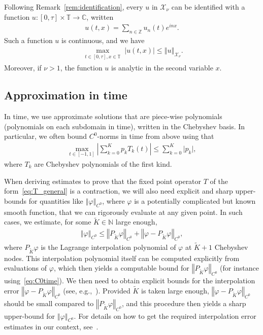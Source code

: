 \documentclass[10pt,a4paper]{article}
\theoremstyle{plain}
\newcommand{\ZZ}{\mathbb Z}
\newcommand{\TT}{\mathbb T}
\newcommand{\CC}{\mathbb C}
\newcommand{\NN}{\mathbb N}
\newcommand{\X}{\mathcal{X}}
\newcommand{\1}{\mathbf{1}}
\begin{document}
Following Remark~\ref{rem:identification}, every $u$ in $\X_\nu$ can be identified with a function $u:[0,\tau]\times\TT\to \CC$, written
\begin{align*}
u(t,x) = \sum_{n\in\ZZ} u_n(t) e^{inx}.
\end{align*}
Such a function $u$ is continuous, and we have
\begin{align*}
\max_{\substack{ t\in[0,\tau] , x \in \TT }} \left\vert u(t,x)\right\vert	\leq \left\Vert u\right\Vert_{\X_\nu}.
\end{align*}
Moreover, if $\nu>1$, the function $u$ is analytic in the second variable $x$.

\subsection{Approximation in time}
\label{sec:interp}

In time, we use approximate solutions that are piece-wise polynomials (polynomials on each subdomain in time), written in the Chebyshev basis. In particular, we often bound $C^0$-norms in time from above using that 
\begin{align}
\label{eq:C0time}
\max_{t\in[-1,1]} \left\vert \sum_{k=0}^K p_k T_k(t) \right\vert \leq \sum_{k=0}^K \vert p_k\vert,
\end{align}
where $T_k$ are Chebyshev polynomials of the first kind.


When deriving estimates to prove that the fixed point operator $T$ of the form~\eqref{eq:T_general} is a contraction, we will also need explicit and sharp upper-bounds for quantities like 
$\left\Vert \varphi \right\Vert_{C^0}$, where $\varphi$ is a potentially complicated but known smooth function, that we can rigorously evaluate at any given point. In such cases, we estimate, for some $\tilde{K}\in\NN$ large enough,
\begin{align}
\label{eq:C0interp}
\left\Vert \varphi \right\Vert_{C^0} \leq  \left\Vert P_{\tilde{K}}\varphi \right\Vert_{C^0} + \left\Vert \varphi - P_{\tilde{K}}\varphi \right\Vert_{C^0},
\end{align}
where $P_{\tilde{K}}\varphi$ is the Lagrange interpolation polynomial of $\varphi$ at $\tilde{K}+1$ Chebyshev nodes. This interpolation polynomial itself can be computed explicitly from evaluations of $\varphi$, which then yields a computable bound for $\left\Vert P_{\tilde{K}}\varphi \right\Vert_{C^0}$ (for instance using~\eqref{eq:C0time}). We then need to obtain explicit bounds for the interpolation error $\left\Vert \varphi - P_{\tilde{K}}\varphi \right\Vert_{C^0}$ (see, e.g.,~\cite{Tre13}). Provided $\tilde{K}$ is taken large enough, $\left\Vert \varphi - P_{\tilde{K}}\varphi \right\Vert_{C^0}$ should be small compared to $\left\Vert P_{\tilde{K}}\varphi \right\Vert_{C^0}$, and this procedure then yields a sharp upper-bound for $\left\Vert \varphi \right\Vert_{C^0}$. For details on how to get the required interpolation error estimates in our context, see~\cite[Section 2.2 and Appendices B and C]{BerBreShe24}.
\end{document}
